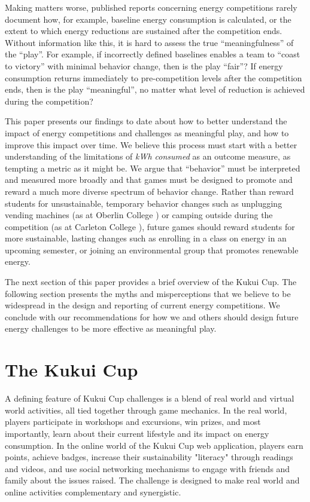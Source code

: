 \documentclass[jou]{apa} %
\begin{document}
Making matters worse, published reports concerning energy competitions rarely document
how, for example, baseline energy consumption is calculated, or the extent to which energy
reductions are sustained after the competition ends.  Without information like this, it is
hard to assess the true ``meaningfulness'' of the ``play''.  For example, if incorrectly
defined baselines enables a team to ``coast to victory'' with minimal behavior change,
then is the play ``fair''? If energy consumption returns immediately to pre-competition
levels after the competition ends, then is the play ``meaningful'', no matter what level
of reduction is achieved during the competition?

This paper presents our findings to date about how to better understand the impact of
energy competitions and challenges as meaningful play, and how to improve this impact over
time.  We believe this process must start with a better understanding of the limitations
of {\em kWh consumed} as an outcome measure, as tempting a metric as it might be.  We
argue that ``behavior'' must be interpreted and measured more broadly and that games must
be designed to promote and reward a much more diverse spectrum of behavior change.  Rather
than reward students for unsustainable, temporary behavior changes such as unplugging
vending machines (as at Oberlin College \cite{Petersen07a}) or camping outside during the
competition (as at Carleton College \cite{Hodge2010}), future games should reward students
for more sustainable, lasting changes such as enrolling in a class on energy in an upcoming
semester, or joining an environmental group that promotes renewable energy.

The next section of this paper provides a brief overview of the Kukui Cup.  The following
section presents the myths and misperceptions that we believe to be widespread in the
design and reporting of current energy competitions. We conclude with our recommendations
for how we and others should design future energy challenges to be more effective as
meaningful play.

\section{The Kukui Cup}

A defining feature of Kukui Cup challenges is a blend of real world and virtual world
activities, all tied together through game mechanics.  In the real world, players
participate in workshops and excursions, win 
prizes, and most importantly, learn about their current lifestyle and its impact on
energy consumption.  In the online world of the Kukui Cup web application, players
earn points, achieve badges, increase their sustainability "literacy" through readings and
videos, and use social networking mechanisms to engage with friends and family about the
issues raised. The challenge is designed to make real world and online activities
complementary and synergistic.
\end{document}
